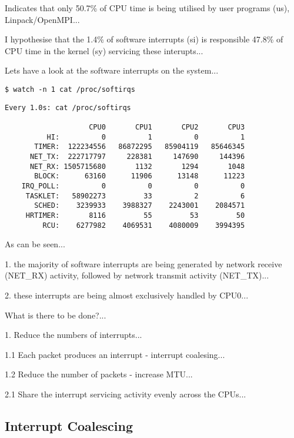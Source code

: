 Indicates that only 50.7\% of CPU time is being utilised by user programs (us), Linpack/OpenMPI...

I hypothesise that the 1.4\% of software interrupts (si) is responsible 47.8\% of CPU time in the kernel (sy) servicing these interupts...

Lets have a look at the software interrupts on the system...

\lstset{style=type}
\begin{lstlisting}
$ watch -n 1 cat /proc/softirqs
\end{lstlisting}


\lstset{style=type}
\begin{lstlisting}
Every 1.0s: cat /proc/softirqs

                    CPU0       CPU1       CPU2       CPU3
          HI:          0          1          0          1
       TIMER:  122234556   86872295   85904119   85646345
      NET_TX:  222717797     228381     147690     144396
      NET_RX: 1505715680       1132       1294       1048
       BLOCK:      63160      11906      13148      11223
    IRQ_POLL:          0          0          0          0
     TASKLET:   58902273         33          2          6
       SCHED:    3239933    3988327    2243001    2084571
     HRTIMER:       8116         55         53         50
         RCU:    6277982    4069531    4080009    3994395
\end{lstlisting}

As can be seen...

1. the majority of software interrupts are being generated by network receive (NET\_RX) activity, followed by network transmit activity (NET\_TX)...

2. these interrupts are being almost exclusively handled by CPU0...

What is there to be done?...

1. Reduce the numbers of interrupts...

1.1 Each packet produces an interrupt - interrupt coalesing...

1.2 Reduce the number of packets - increase MTU...

2.1 Share the interrupt servicing activity evenly across the CPUs...



%
%
\subsection{Interrupt Coalescing}

